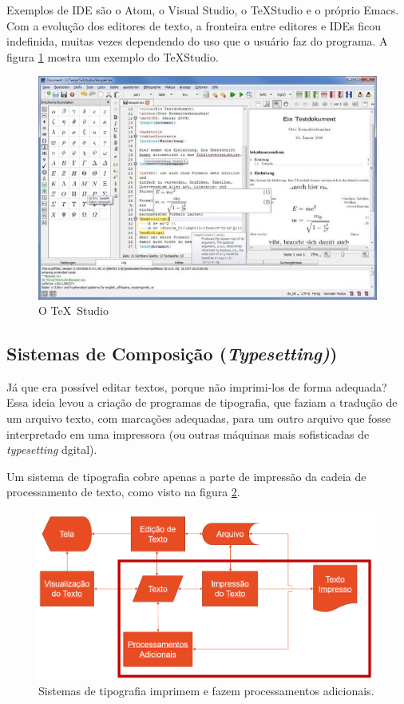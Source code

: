 Exemplos de IDE são o Atom, o Visual Studio, o \TeX Studio e o próprio Emacs. Com a evolução dos editores de texto, a fronteira entre editores e IDEs ficou  indefinida, muitas vezes dependendo do uso que o usuário faz do programa. A figura \ref{fig:texstudio} mostra um exemplo do \TeX Studio.




\begin{figure}[hbt]
    \centering
    \includegraphics[width=0.7\linewidth]{Images/Picture1}
    \caption{O \TeX\ Studio}
    \label{fig:texstudio}
\end{figure}

\subsection{Sistemas de Composição (\textit{Typesetting)})}

Já que era possível editar textos, porque não imprimi-los de forma adequada? Essa ideia levou a criação de programas de tipografia, que faziam a tradução de um arquivo texto, com marcações adequadas, para um outro arquivo que fosse interpretado em uma impressora (ou outras máquinas mais sofisticadas de \textit{typesetting} dgital). 

Um sistema de tipografia cobre apenas a parte de impressão da cadeia de processamento de texto, como visto na figura \ref{fig:sisttipo1}.

\begin{figure}[hbt]
    \centering
    \includegraphics[width=0.7\linewidth]{Images/latex1}
    \caption[Sistemas de tipografia]{Sistemas de tipografia imprimem e fazem processamentos adicionais.}
    \label{fig:sisttipo1}
\end{figure}


